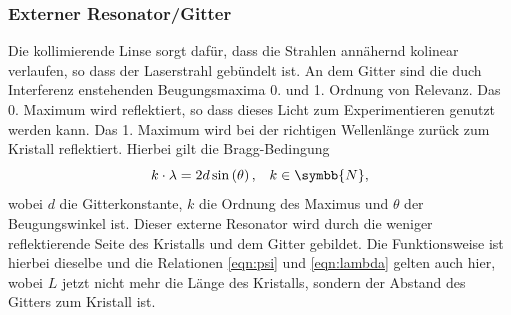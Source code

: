 \subsubsection{Externer Resonator/Gitter}
\label{subsubsec:externeResonator}
Die kollimierende Linse sorgt dafür, dass die Strahlen annähernd kolinear verlaufen, so dass der Laserstrahl gebündelt ist.
An dem Gitter sind die duch Interferenz enstehenden Beugungsmaxima 0. und 1. Ordnung von Relevanz.
Das 0. Maximum wird reflektiert, so dass dieses Licht zum Experimentieren genutzt werden kann. Das 1. Maximum wird bei der richtigen Wellenlänge zurück zum Kristall reflektiert.
Hierbei gilt die Bragg-Bedingung
\begin{equation}
   k \cdot \lambda = 2d \sin \left (  \theta \right ) , \; \; \; k \in \symbb{N} \label{eqn:bragg} ,
\end{equation}
wobei $d$ die Gitterkonstante, $k$ die Ordnung des Maximus und $\theta$ der Beugungswinkel ist.
Dieser externe Resonator wird durch die weniger reflektierende Seite des Kristalls und dem Gitter gebildet.
Die Funktionsweise ist hierbei dieselbe und die Relationen \ref{eqn:psi} und \ref{eqn:lambda} gelten auch hier, wobei $L$ jetzt nicht mehr die Länge des Kristalls, sondern 
der Abstand des Gitters zum Kristall ist.
